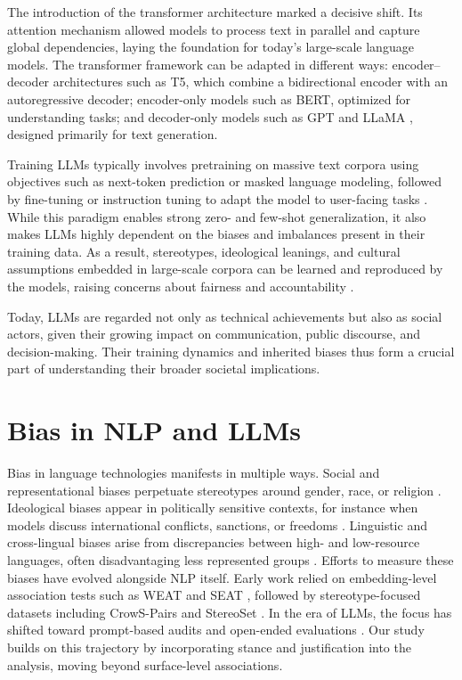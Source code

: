 The introduction of the transformer architecture \parencite{vaswani2017attention} marked a decisive shift. Its attention mechanism allowed models to process text in parallel and capture global dependencies, laying the foundation for today’s large-scale language models. The transformer framework can be adapted in different ways: encoder–decoder architectures such as T5, which combine a bidirectional encoder with an autoregressive decoder; encoder-only models such as BERT, optimized for understanding tasks; and decoder-only models such as GPT and LLaMA \parencite{radford2018improving,brown2020language,touvron_llama_2023}, designed primarily for text generation.

Training LLMs typically involves pretraining on massive text corpora using objectives such as next-token prediction or masked language modeling, followed by fine-tuning or instruction tuning to adapt the model to user-facing tasks \parencite{ouyang2022training}. While this paradigm enables strong zero- and few-shot generalization, it also makes LLMs highly dependent on the biases and imbalances present in their training data. As a result, stereotypes, ideological leanings, and cultural assumptions embedded in large-scale corpora can be learned and reproduced by the models, raising concerns about fairness and accountability \parencite{STAHL2024102700,navigating-llm-ethics}.

Today, LLMs are regarded not only as technical achievements but also as social actors, given their growing impact on communication, public discourse, and decision-making. Their training dynamics and inherited biases thus form a crucial part of understanding their broader societal implications.

\section{Bias in NLP and LLMs}
Bias in language technologies manifests in multiple ways. Social and representational biases perpetuate stereotypes around gender, race, or religion \parencite{gender_gpt2023,stereoset2021,crows2020pairs}. Ideological biases appear in politically sensitive contexts, for instance when models discuss international conflicts, sanctions, or freedoms \parencite{silence_llms2023,opiniongpt2023,russia_china_war2024}. Linguistic and cross-lingual biases arise from discrepancies between high- and low-resource languages, often disadvantaging less represented groups \parencite{nationality_bias2013}.
Efforts to measure these biases have evolved alongside NLP itself. Early work relied on embedding-level association tests such as WEAT and SEAT \parencite{greenwald1998iat,kurita2019bias,may2019seat}, followed by stereotype-focused datasets including CrowS-Pairs and StereoSet \parencite{crows2020pairs,stereoset2021}. In the era of LLMs, the focus has shifted toward prompt-based audits and open-ended evaluations \parencite{detecting2023,opiniongpt2023}. Our study builds on this trajectory by incorporating stance and justification into the analysis, moving beyond surface-level associations.


